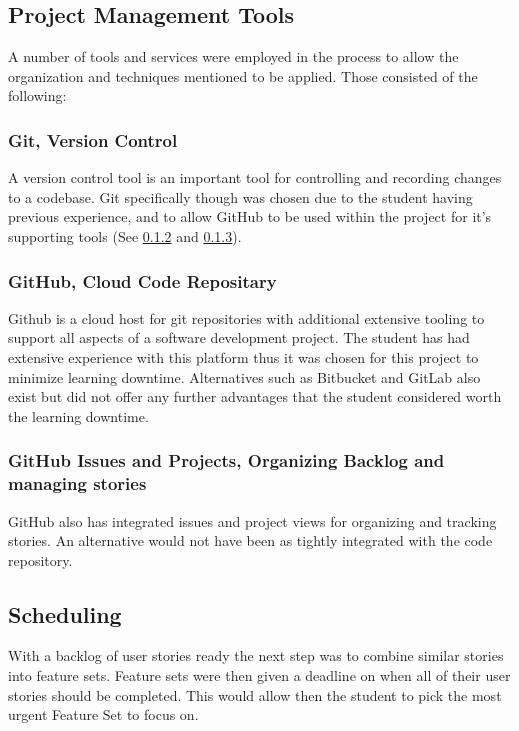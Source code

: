 \subsection{Project Management Tools}
A number of tools and services were employed in the process to allow the organization and techniques mentioned to be applied. Those consisted of the following:

\subsubsection{Git, Version Control}
A version control tool is an important tool for controlling and recording changes to a codebase.
Git specifically though was chosen due to the student having previous experience, and to allow GitHub to be used within the project for it's supporting tools (See \ref{github} and \ref{github2}).

\subsubsection{GitHub, Cloud Code Repositary} \label{github}
Github is a cloud host for git repositories with additional extensive tooling to support all aspects of a software development project. The student has had extensive experience with this platform thus it was chosen for this project to minimize learning downtime. Alternatives such as Bitbucket and GitLab also exist but did not offer any further advantages that the student considered worth the learning downtime.

\subsubsection{GitHub Issues and Projects, Organizing Backlog and managing stories} \label{github2}
GitHub also has integrated issues and project views for organizing and tracking stories. An alternative would not have been as tightly integrated with the code repository.

\subsection{Scheduling} \label{scheduling}
With a backlog of user stories ready the next step was to combine similar stories into feature sets. Feature sets were then given a deadline on when all of their user stories should be completed.
This would allow then the student to pick the most urgent Feature Set to focus on.

